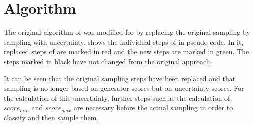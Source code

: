 \section{Algorithm}
\label{sec:algorithm}

The original algorithm of \kbgan was modified for \usgan by replacing the original sampling by sampling with uncertainty.
 shows the individual steps of \kbgan in pseudo code.
In it, replaced steps of \kbgan are marked in red and the new steps are marked in green.
The steps marked in black have not changed from the original approach.

It can be seen that the original sampling steps have been replaced and that sampling is no longer based on generator scores but on uncertainty scores.
For the calculation of this uncertainty, further steps such as the calculation of $score_{min}$ and $score_{max}$ are necessary before the actual sampling in order to classify and then sample them.